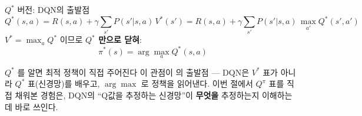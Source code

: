 \begin{frame}{$Q^{*}$ 버전: DQN의 출발점}
  \[
  Q^{*}(s,a) = R(s,a) + \gamma \sum_{s'} P(s'|s,a)\, V^{*}(s')
  = R(s,a) + \gamma \sum_{s'} P(s'|s,a)\, \max_{a'} Q^{*}(s',a')
  \]
  $V^{*} = \max_a Q^{*}$ 이므로 \textbf{$Q^{*}$ 만으로 닫혀}:
  \[
  \pi^{*}(s) = \arg\max_a Q^{*}(s,a)
  \]
  \begin{block}{$Q^{*}$ 를 알면 최적 정책이 직접 주어진다}
    이 관점이 의
    출발점 --- DQN은 $V^{*}$ 표가 아니라 $Q^{*}$ 표(신경망)를
    배우고, $\arg\max$ 로 정책을 읽어낸다. 이번 절에서 $Q^\pi$
    표를 직접 채워본 경험은, DQN의 ``Q값을 추정하는 신경망''이
    \textbf{무엇을} 추정하는지 이해하는 데 바로 쓰인다.
  \end{block}
\end{frame}
